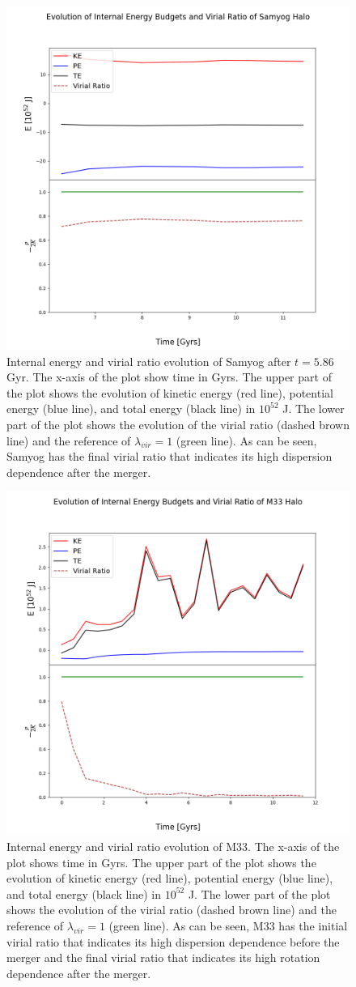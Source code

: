 \documentclass[twocolumn]{aastex631}
\begin{document}
\begin{figure}[htbp]
\includegraphics[width=.5\textwidth]{Samyog_energies_virial_ratios.png}
\caption{Internal energy and virial ratio evolution of Samyog after $t=5.86$ Gyr. The x-axis of the plot show time in Gyrs. The upper part of the plot shows the evolution of kinetic energy (red line), potential energy (blue line), and total energy (black line) in $10^{52}$ J. The lower part of the plot shows the evolution of the virial ratio (dashed brown line) and the reference of $\lambda_{vir}=1$ (green line). As can be seen, Samyog has the final virial ratio that indicates its high dispersion dependence after the merger.
\label{fig:Samyog_plot}}
\end{figure}

\begin{figure}[htbp]
\includegraphics[width=.5\textwidth]{M33_energies_virial_ratios.png}
\caption{Internal energy and virial ratio evolution of M33. The x-axis of the plot shows time in Gyrs. The upper part of the plot shows the evolution of kinetic energy (red line), potential energy (blue line), and total energy (black line) in $10^{52}$ J. The lower part of the plot shows the evolution of the virial ratio (dashed brown line) and the reference of $\lambda_{vir}=1$ (green line). As can be seen, M33 has the initial virial ratio that indicates its high dispersion dependence before the merger and the final virial ratio that indicates its high rotation dependence after the merger.
\label{fig:M33_plot}}
\end{figure}
\end{document}
